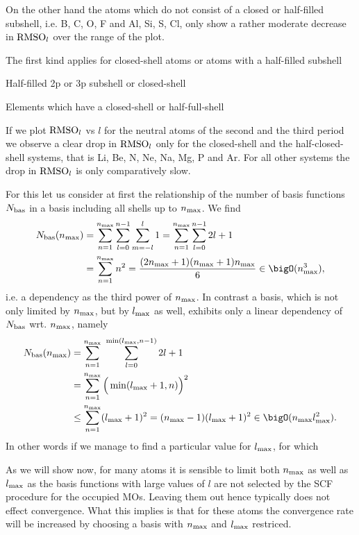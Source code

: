 On the other hand the atoms which do not consist
of a closed or half-filled subshell,
i.e. B, C, O, F and Al, Si, S, Cl,
only show a rather moderate decrease in $\text{RMSO}_l$ over the range of the plot.



The first kind applies for closed-shell atoms or atoms
with a half-filled subshell


Half-filled 2p or 3p subshell
or closed-shell

Elements which have a closed-shell or half-full-shell 


If we plot $\text{RMSO}_l$ vs $l$ for the neutral atoms of the
second and the third period
we observe a clear drop in $\text{RMSO}_l$ only for the closed-shell
and the half-closed-shell systems,
that is Li, Be, N, Ne, Na, Mg, P and Ar.
For all other systems the drop in $\text{RMSO}_l$ is only comparatively slow.







For this let us consider at first the relationship of the number of basis
functions $N_\text{bas}$ in a \CS basis including all shells up to $n_\text{max}$.
We find
\begin{align}
	\nonumber
	\Nbas(\nmax) &= \sum_{n=1}^{\nmax} \sum_{l=0}^{n-1} \sum_{m=-l}^l 1
		= \sum_{n=1}^{\nmax} \sum_{l=0}^{n-1} 2l+1 \\
		&= \sum_{n=1}^{\nmax} n^2
		= \frac{(2\nmax+1)(\nmax+1)\nmax}{6}
		\in \bigO(\nmax^3),
	\label{eqn:NbaxFullShellBasis}
\end{align}
i.e. a dependency as the third power of $n_\text{max}$.
In contrast a basis, which is not only limited by $n_\text{max}$, but by $l_\text{max}$ as well,
exhibits only a linear dependency of $N_\text{bas}$ wrt. $n_\text{max}$, namely
\begin{align}
	\nonumber
	\Nbas(\nmax) &= \sum_{n=1}^{\nmax} \ \sum_{l=0}^{\min(\lmax, n-1)} 2l + 1 \\
	&= \sum_{n=1}^{\nmax} \Big( \min(\lmax+1, n) \Big)^2 \\
	\nonumber
	&\le \sum_{n=1}^{\nmax} (\lmax+1)^2 = (\nmax-1) (\lmax+1)^2
	\in \bigO(\nmax \lmax^2).
\end{align}
In other words if we manage to find a particular value for $l_\text{max}$,
for which





As we will show now,
for many atoms it is sensible to limit both $n_\text{max}$ as well as $l_\text{max}$
as the \CS basis functions with large values of $l$ are not selected
by the SCF procedure for the occupied MOs.
Leaving them out hence typically does not effect convergence.
What this implies is that for these atoms the convergence rate
will be increased by choosing a basis with $n_\text{max}$ and $l_\text{max}$ restriced.


